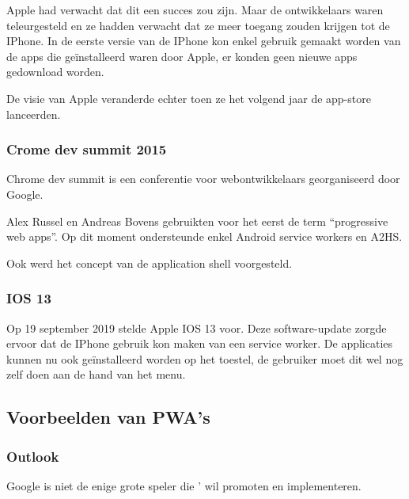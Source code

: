 		Apple had verwacht dat dit een succes zou zijn. Maar de ontwikkelaars waren teleurgesteld en ze hadden verwacht dat ze meer toegang zouden krijgen tot de IPhone. In de eerste versie van de IPhone kon enkel gebruik gemaakt worden van de apps die geïnstalleerd waren door Apple, er konden geen nieuwe apps gedownload worden.
		\autocite{Strieb2016}
		
		 De visie van Apple veranderde echter toen ze het volgend jaar de app-store lanceerden. \autocite{Silver2018}
	 
	 \subsubsection{Crome dev summit 2015}
	 
		 Chrome dev summit is een conferentie voor webontwikkelaars georganiseerd door Google. 
		 
		 Alex Russel en Andreas Bovens gebruikten voor het eerst de term “progressive web apps”. Op dit moment ondersteunde enkel Android service workers en A2HS.
		 
		 Ook werd het concept van de application shell voorgesteld.
		 \autocite{Russel2015}
	 
	 
	 \subsubsection{IOS 13}
		 Op 19 september 2019 stelde Apple IOS 13 voor. Deze software-update zorgde ervoor dat de IPhone gebruik kon maken van een service worker. De applicaties kunnen nu ook geïnstalleerd worden op het toestel, de gebruiker moet dit wel nog zelf doen aan de hand van het menu.
		 \autocite{Apple2020}
	 


\subsection{Voorbeelden van PWA's}
	
	\subsubsection{Outlook}
		Google is niet de enige grote speler die ' wil promoten en implementeren.
		\autocite{Microsoft2020}
		
